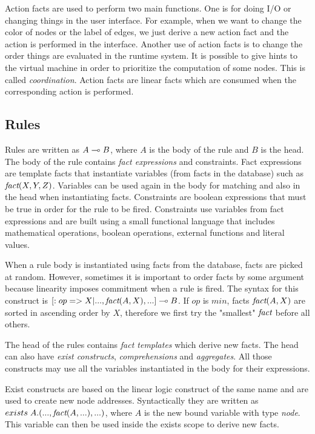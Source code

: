 Action facts are used to perform two main functions. One is for doing I/O or changing things
in the user interface. For example, when we want to change the color of nodes or the label
of edges, we just derive a new action fact and the action is performed in the interface.
Another use of action facts is to change the order things are evaluated in the runtime system.
It is possible to give hints to the virtual machine in order to prioritize the computation of
some nodes. This is called \emph{coordination}.
Action facts are linear facts which are consumed when the corresponding action is performed.

\subsection{Rules}

Rules are written as $A \multimap B$, where $A$ is the body of the rule and $B$ is the head.
The body of the rule contains \emph{fact expressions} and constraints.
Fact expressions are template facts that instantiate variables (from facts in the database)
such as $\emph{fact}(X, Y, Z)$. Variables can be used again in the body for matching and
also in the head when instantiating facts. Constraints are boolean expressions that must
be true in order for the rule to be fired. Constraints use variables from fact expressions and are built using a small functional language that includes mathematical operations, boolean operations, external functions and literal values.

When a rule body is instantiated using facts from the database, facts are picked at random. However,
sometimes it is important to order facts by some argument because linearity imposes commitment when a rule is fired. The syntax for this construct is $[:op => X | ..., \emph{fact}(A, X), ...] \multimap B$. If $op$ is $min$, facts $\emph{fact}(A, X)$ are sorted in ascending order by $X$, therefore we first try the "smallest" $\emph{fact}$ before all others.

The head of the rules contains \emph{fact templates} which derive new facts. The head can also have \emph{exist constructs}, \emph{comprehensions} and \emph{aggregates}. All those constructs may use all the variables instantiated in the body for their expressions.

Exist constructs are based on the linear logic construct of the same name and are used to create new node addresses. Syntactically they are written as $exists \; A. (..., \emph{fact}(A, ...), ...)$, where $A$ is the new bound variable with type \emph{node}. This variable can then be used inside the exists scope to derive new facts.

